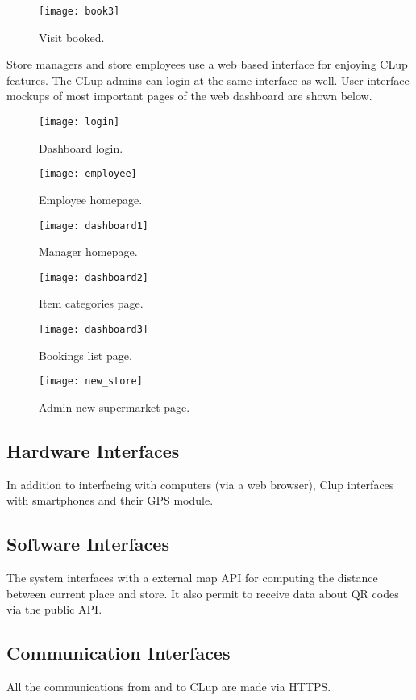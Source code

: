 \clearpage

\begin{figure}[H]
	\centering
	\texttt{[image: book3]}
	\caption{Visit booked.}
\end{figure}

Store managers and store employees use a web based interface for enjoying CLup features. The CLup admins can login at the same interface as well.
User interface mockups of most important pages of the web dashboard are shown below.
\vspace{2em}
\begin{figure}[H]
	\centering
	\texttt{[image: login]}
	\caption{Dashboard login.}
\end{figure}

\begin{figure}[H]
	\centering
	\texttt{[image: employee]}
	\caption{Employee homepage.}
\end{figure}
\begin{figure}[H]
	\centering
	\texttt{[image: dashboard1]}
	\caption{Manager homepage.}
\end{figure}
\begin{figure}[H]
	\centering
	\texttt{[image: dashboard2]}
	\caption{Item categories page.}
\end{figure}
\begin{figure}[H]
	\centering
	\texttt{[image: dashboard3]}
	\caption{Bookings list page.}
\end{figure}
\begin{figure}[H]
	\centering
	\texttt{[image: new\_store]}
	\caption{Admin new supermarket page.}
\end{figure}
\clearpage

\subsection{Hardware Interfaces}
In addition to interfacing with computers (via a web browser), Clup interfaces with smartphones and their GPS module.
\subsection{Software Interfaces}
The system interfaces with a external map API for computing the distance between current place and store. It also permit to receive data
about QR codes via the public API.
\subsection{Communication Interfaces}
All the communications from and to CLup are made via HTTPS.

